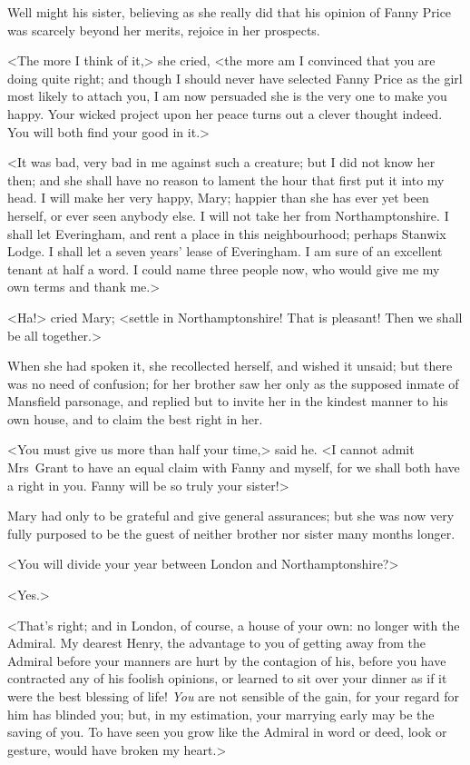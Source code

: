 Well might his sister, believing as she really did that his opinion of Fanny Price was scarcely beyond her merits, rejoice in her prospects.

<The more I think of it,> she cried, <the more am I convinced that you are doing quite right; and though I should never have selected Fanny Price as the girl most likely to attach you, I am now persuaded she is the very one to make you happy. Your wicked project upon her peace turns out a clever thought indeed. You will both find your good in it.>

<It was bad, very bad in me against such a creature; but I did not know her then; and she shall have no reason to lament the hour that first put it into my head. I will make her very happy, Mary; happier than she has ever yet been herself, or ever seen anybody else. I will not take her from Northamptonshire. I shall let Everingham, and rent a place in this neighbourhood; perhaps Stanwix Lodge. I shall let a seven years' lease of Everingham. I am sure of an excellent tenant at half a word. I could name three people now, who would give me my own terms and thank me.>

<Ha!> cried Mary; <settle in Northamptonshire! That is pleasant! Then we shall be all together.>

When she had spoken it, she recollected herself, and wished it unsaid; but there was no need of confusion; for her brother saw her only as the supposed inmate of Mansfield parsonage, and replied but to invite her in the kindest manner to his own house, and to claim the best right in her.

<You must give us more than half your time,> said he. <I cannot admit Mrs~Grant to have an equal claim with Fanny and myself, for we shall both have a right in you. Fanny will be so truly your sister!>

Mary had only to be grateful and give general assurances; but she was now very fully purposed to be the guest of neither brother nor sister many months longer.

<You will divide your year between London and Northamptonshire?>

<Yes.>

<That's right; and in London, of course, a house of your own: no longer with the Admiral. My dearest Henry, the advantage to you of getting away from the Admiral before your manners are hurt by the contagion of his, before you have contracted any of his foolish opinions, or learned to sit over your dinner as if it were the best blessing of life! \textit{You}  are not sensible of the gain, for your regard for him has blinded you; but, in my estimation, your marrying early may be the saving of you. To have seen you grow like the Admiral in word or deed, look or gesture, would have broken my heart.>

